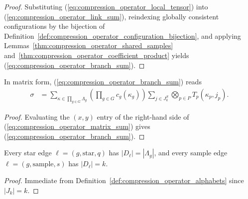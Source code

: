 \begin{proof}\leanok
    Substituting (\ref{eq:compression_operator_local_tensor}) into (\ref{eq:compression_operator_link_sum}), reindexing globally consistent configurations by the bijection of Definition~\ref{def:compression_operator_configuration_bijection}, and applying Lemmas~\ref{thm:compression_operator_shared_samples} and~\ref{thm:compression_operator_coefficient_product} yields (\ref{eq:compression_operator_branch_sum}).
\end{proof}

\begin{lemma}
    \label{thm:compression_operator_matrix_sum}
    \leanok
    In matrix form, (\ref{eq:compression_operator_branch_sum}) reads
    \begin{align}
        \sigma
         & =\sum_{\kappa\in\prod_{g\in G}\Lambda_g}
        \left(\prod_{g\in G}c_g(\kappa_g)\right)
        \sum_{j\in J_k^S}\bigotimes_{p\in P}T_p(\kappa_p,j_p).
        \label{eq:compression_operator_matrix_sum}
    \end{align}
\end{lemma}

\begin{proof}\leanok
    Evaluating the $(x,y)$ entry of the right-hand side of (\ref{eq:compression_operator_matrix_sum}) gives (\ref{eq:compression_operator_branch_sum}).
\end{proof}

\begin{lemma}
    \label{thm:compression_operator_alphabet_card}
    \leanok
    Every star edge $\ell=(g,\mathrm{star},q)$ has $|D_\ell|=|\Lambda_g|$, and every sample edge $\ell=(g,\mathrm{sample},s)$ has $|D_\ell|=k$.
\end{lemma}

\begin{proof}\leanok
    Immediate from Definition~\ref{def:compression_operator_alphabets} since $|J_k|=k$.
\end{proof}

